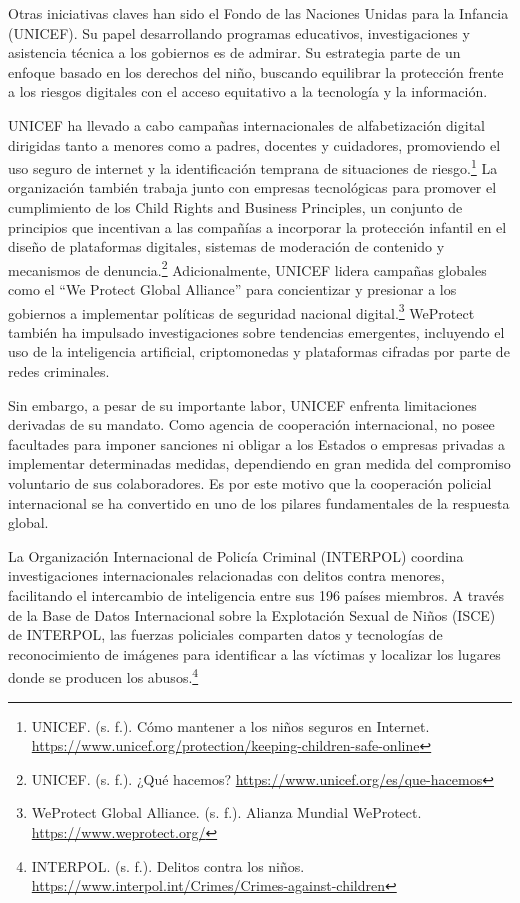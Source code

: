 Otras iniciativas claves han sido el Fondo de las Naciones Unidas para la Infancia (UNICEF). Su papel desarrollando programas educativos, investigaciones y asistencia técnica a los gobiernos es de admirar. Su estrategia parte de un enfoque basado en los derechos del niño, buscando equilibrar la protección frente a los riesgos digitales con el acceso equitativo a la tecnología y la información.

UNICEF ha llevado a cabo campañas internacionales de alfabetización digital dirigidas tanto a menores como a padres, docentes y cuidadores, promoviendo el uso seguro de internet y la identificación temprana de situaciones de riesgo.\footnote{UNICEF. (s. f.). Cómo mantener a los niños seguros en Internet. \url{https://www.unicef.org/protection/keeping-children-safe-online}} La organización también trabaja junto con empresas tecnológicas para promover el cumplimiento de los Child Rights and Business Principles, un conjunto de principios que incentivan a las compañías a incorporar la protección infantil en el diseño de plataformas digitales, sistemas de moderación de contenido y mecanismos de denuncia.\footnote{UNICEF. (s. f.). ¿Qué hacemos? \url{https://www.unicef.org/es/que-hacemos}} Adicionalmente, UNICEF lidera campañas globales como el “We Protect Global Alliance” para concientizar y presionar a los gobiernos a implementar políticas de seguridad nacional digital.\footnote{WeProtect Global Alliance. (s. f.). Alianza Mundial WeProtect. \url{https://www.weprotect.org/}} WeProtect también ha impulsado investigaciones sobre tendencias emergentes, incluyendo el uso de la inteligencia artificial, criptomonedas y plataformas cifradas por parte de redes criminales.

Sin embargo, a pesar de su importante labor, UNICEF enfrenta limitaciones derivadas de su mandato. Como agencia de cooperación internacional, no posee facultades para imponer sanciones ni obligar a los Estados o empresas privadas a implementar determinadas medidas, dependiendo en gran medida del compromiso voluntario de sus colaboradores. Es por este motivo que la cooperación policial internacional se ha convertido en uno de los pilares fundamentales de la respuesta global.

La Organización Internacional de Policía Criminal (INTERPOL) coordina investigaciones internacionales relacionadas con delitos contra menores, facilitando el intercambio de inteligencia entre sus 196 países miembros. A través de la Base de Datos Internacional sobre la Explotación Sexual de Niños (ISCE) de INTERPOL, las fuerzas policiales comparten datos y tecnologías de reconocimiento de imágenes para identificar a las víctimas y localizar los lugares donde se producen los abusos.\footnote{INTERPOL. (s. f.). Delitos contra los niños. \url{https://www.interpol.int/Crimes/Crimes-against-children}}

